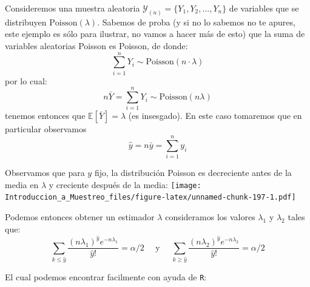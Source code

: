\documentclass[
]{book}
\begin{document}
Consideremos una muestra aleatoria \(\mathcal{Y}_{(n)} = \{ Y_1, Y_2, \dots, Y_n\}\) de variables que se distribuyen \(\text{Poisson}(\lambda)\). Sabemos de proba (y si no lo sabemos no te apures, este ejemplo es sólo para ilustrar, no vamos a hacer más de esto) que la suma de variables aleatorias Poisson es Poisson, de donde:
\[
\sum\limits_{i = 1}^n Y_i \sim\text{Poisson}(n \cdot \lambda)
\]
por lo cual:
\[
n \bar{Y} =  \sum\limits_{i = 1}^n Y_i \sim\text{Poisson}(n\lambda)
\]
tenemos entonces que \(\mathbb{E}[\bar{Y}] = \lambda\) (es insesgado). En este caso tomaremos que en particular observamos
\[
\hat{y} = n \bar{y} = \sum\limits_{i = 1}^n y_i
\]

Observamos que para \(y\) fijo, la distribución Poisson es decreciente antes de la media en \(\lambda\) y creciente después de la media:
\texttt{[image: Introduccion\_a\_Muestreo\_files/figure-latex/unnamed-chunk-197-1.pdf]}

Podemos entonces obtener un estimador \(\lambda\) consideramos los valores \(\lambda_1\) y \(\lambda_2\) tales que:
\[
\sum\limits_{k \leq \hat{y}} \dfrac{(n\lambda_1)^{\hat{y}} e^{-n\lambda_1}}{\hat{y}!} = \alpha / 2 \quad \text{ y } \quad \sum\limits_{k  \geq \hat{y}} \dfrac{(n\lambda_2)^{\hat{y}} e^{-n\lambda_2}}{\hat{y}!} =\alpha / 2
\]

El cual podemos encontrar facilmente con ayuda de \texttt{R}:
\end{document}
